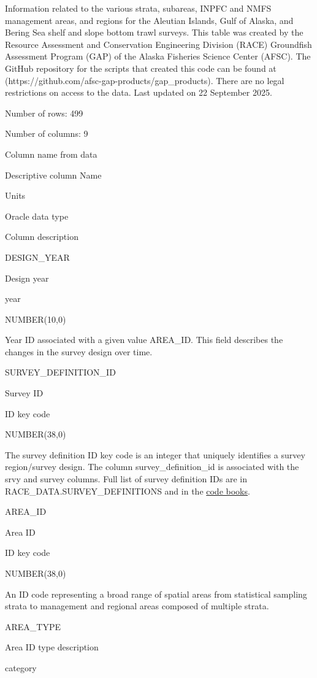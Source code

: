 \documentclass[
  letterpaper,
  oneside,
  open=any]{scrbook}
\begin{document}
Information related to the various strata, subareas, INPFC and NMFS
management areas, and regions for the Aleutian Islands, Gulf of Alaska,
and Bering Sea shelf and slope bottom trawl surveys. This table was
created by the Resource Assessment and Conservation Engineering Division
(RACE) Groundfish Assessment Program (GAP) of the Alaska Fisheries
Science Center (AFSC). The GitHub repository for the scripts that
created this code can be found at
(https://github.com/afsc-gap-products/gap\_products). There are no legal
restrictions on access to the data. Last updated on 22 September 2025.

Number of rows: 499

Number of columns: 9

Column name from data

Descriptive column Name

Units

Oracle data type

Column description

DESIGN\_YEAR

Design year

year

NUMBER(10,0)

Year ID associated with a given value AREA\_ID. This field describes the
changes in the survey design over time.

SURVEY\_DEFINITION\_ID

Survey ID

ID key code

NUMBER(38,0)

The survey definition ID key code is an integer that uniquely identifies
a survey region/survey design. The column survey\_definition\_id is
associated with the srvy and survey columns. Full list of survey
definition IDs are in RACE\_DATA.SURVEY\_DEFINITIONS and in the
\href{https://www.fisheries.noaa.gov/resource/document/groundfish-survey-species-code-manual-and-data-codes-manual}{code
books}.

AREA\_ID

Area ID

ID key code

NUMBER(38,0)

An ID code representing a broad range of spatial areas from statistical
sampling strata to management and regional areas composed of multiple
strata.

AREA\_TYPE

Area ID type description

category
\end{document}
